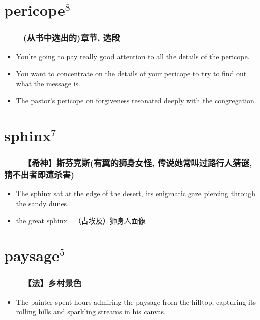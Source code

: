 \documentclass[UTF8,4pt,a3paper,space]{article}
\begin{document}
\begin{multicols}{4}
\section{pericope$^8$}
\subsubsection*{\ \ \ \ (从书中选出的)章节, 选段}\begin{itemize}
\itemsep-0.5em
    \item You're going to pay really good attention to all the details of the pericope.    \item You want to concentrate on the details of your pericope to try to find out what the message is.    \item The pastor's pericope on forgiveness resonated deeply with the congregation. 
\end{itemize}
\hrulefill


\section{sphinx$^7$}
\subsubsection*{\ \ \ \ 【希神】斯芬克斯(有翼的狮身女怪, 传说她常叫过路行人猜谜, 猜不出者即遭杀害)}\begin{itemize}
\itemsep-0.5em
    \item The sphinx sat at the edge of the desert, its enigmatic gaze piercing through the sandy dunes. 
\end{itemize}
\begin{itemize}
\itemsep-0.5em
   \item the great sphinx\ \ （古埃及）狮身人面像
\end{itemize}
\hrulefill


\section{paysage$^5$}
\subsubsection*{\ \ \ \ 【法】乡村景色}\begin{itemize}
\itemsep-0.5em
    \item The painter spent hours admiring the paysage from the hilltop, capturing its rolling hills and sparkling streams in his canvas. 
\end{itemize}
\hrulefill



\end{multicols}
\end{document}
